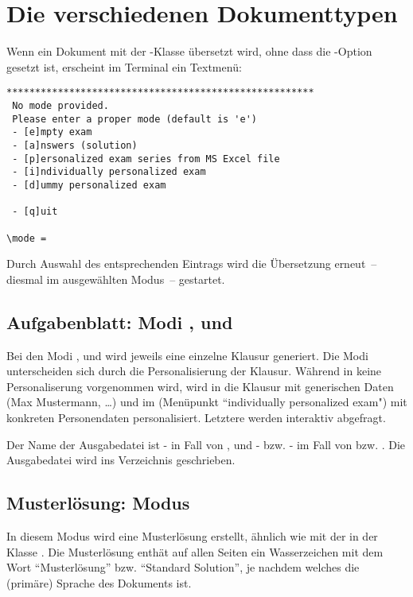 \documentclass[
load=osgexam,
babel=ngerman
]{skdoc}
\begin{document}
\section{Die verschiedenen Dokumenttypen}
Wenn ein Dokument mit der \thepkg-Klasse übersetzt wird, ohne dass die -Option gesetzt ist, erscheint
im Terminal ein Textmenü:
\begin{verbatim}
******************************************************
 No mode provided.
 Please enter a proper mode (default is 'e') 
 - [e]mpty exam
 - [a]nswers (solution)
 - [p]ersonalized exam series from MS Excel file
 - [i]ndividually personalized exam
 - [d]ummy personalized exam

 - [q]uit 

\mode =
\end{verbatim}

Durch Auswahl des entsprechenden Eintrags wird die Übersetzung erneut~-- diesmal im ausgewählten Modus~-- gestartet.

\subsection{Aufgabenblatt: Modi ,  und }
Bei den Modi  ,  und  wird jeweils eine einzelne Klausur generiert.
Die Modi unterscheiden sich durch die Personalisierung der Klausur. Während in  keine Personaliserung
vorgenommen wird, wird in  die Klausur mit generischen Daten (Max Mustermann, \ldots) und im 
(Menüpunkt ``individually personalized exam") mit konkreten Personendaten personalisiert. Letztere werden interaktiv
abgefragt.

Der Name der Ausgabedatei ist - in Fall von , und
- bzw. - im Fall von  bzw. . Die
Ausgabedatei wird ins Verzeichnis  geschrieben.

\subsection{Musterlösung: Modus }
In diesem Modus wird eine Musterlösung erstellt, ähnlich wie mit der  in der Klasse .
Die Musterlösung enthät auf allen Seiten ein Wasserzeichen mit dem Wort ``Musterlösung'' bzw. ``Standard Solution'', je
nachdem welches die (primäre) Sprache des Dokuments ist.
\end{document}

